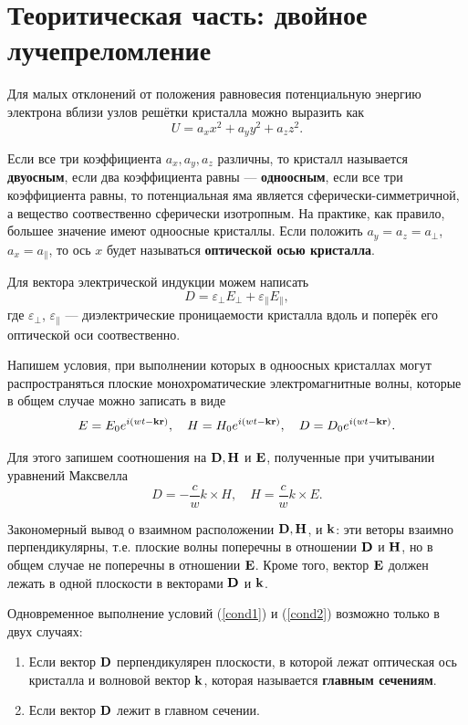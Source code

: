 \documentclass[12pt]{article}
\begin{document}
\section*{Теоритическая часть: двойное лучепреломление}
\par
	Для малых отклонений от положения равновесия потенциальную энергию электрона вблизи узлов решётки кристалла можно выразить как
\[
	U = a_x x^2 + a_y y^2 + a_z z^2.
\]
\par
	Если все три коэффициента $a_x, a_y, a_z$ различны, то кристалл называется {\bf двуосным}, если два коэффициента равны --- {\bf одноосным}, если все три коэффициента равны, то потенциальная яма является сферически-симметричной, а вещество соотвественно сферически изотропным. На практике, как правило, большее значение имеют одноосные кристаллы. Если положить $a_y = a_z = a_\perp$, $a_x = a_\parallel$, то ось $x$ будет называться {\bf оптической осью кристалла}.
\par
	Для вектора электрической индукции можем написать
\begin{equation}
	D = \varepsilon_\perp E_\perp + \varepsilon_\parallel E_\parallel, \label{cond1}
\end{equation}
где $\varepsilon_\perp$, $\varepsilon_\parallel$ --- диэлектрические проницаемости кристалла вдоль и поперёк его оптической оси соотвественно.
\par
	Напишем условия, при выполнении которых в одноосных кристаллах могут распространяться плоские монохроматические электромагнитные волны, которые в общем случае можно записать в виде
\[
	E = E_0 e^{i(wt-{\bf kr})}, \quad H = H_0 e^{i(wt-{\bf kr})}, \quad D = D_0 e^{i(wt-{\bf kr})}.
\]
\par
	Для этого запишем соотношения на ${\bf D, H}$ и ${\bf E}$, полученные при учитывании уравнений Максвелла
\begin{equation}
	D = - \frac{c}{w} k \times H, \quad H = \frac{c}{w} k \times E. \label{cond2}
\end{equation}
\par
	Закономерный вывод о взаимном расположении ${\bf D, H}$, и ${\bf k}$: эти веторы взаимно перпендикулярны, т.е. плоские волны поперечны в отношении ${\bf D}$ и ${\bf H}$, но в общем случае не поперечны в отношении ${\bf E}$. Кроме того, вектор ${\bf E}$ должен лежать в одной плоскости в векторами ${\bf D}$ и ${\bf k}$.
\par
	Одновременное выполнение условий (\ref{cond1}) и (\ref{cond2}) возможно только в двух случаях:
\begin{enumerate}
	\item
		Если вектор ${\bf D}$ перпендикулярен плоскости, в которой лежат оптическая ось кристалла и волновой вектор ${\bf k}$, которая называется {\bf главным сечениям}.
	\item
		Если вектор ${\bf D}$ лежит в главном сечении.
\end{enumerate}
\end{document}
